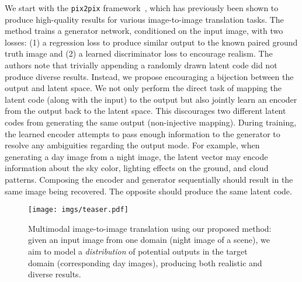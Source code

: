 \documentclass{article}
\newcommand{\pp}{\texttt{pix2pix}\xspace}
\begin{document}
We start with the \pp framework~\citep{isola2016image}, which has previously been shown to produce high-quality results for various image-to-image translation tasks. The method trains a generator network, conditioned on the input image, with two losses: (1) a regression loss to produce similar output to the known paired ground truth image and (2) a learned discriminator loss to encourage realism. The authors note that trivially appending a randomly drawn latent code did not produce diverse results. Instead, we propose encouraging a bijection between the output and latent space. 
We not only perform the direct task of mapping the latent code (along with the input) to the output but also jointly learn an encoder from the output back to the latent space. 
This discourages two different latent codes from generating the same output (non-injective mapping).
During training, the learned encoder attempts to pass enough information to the generator to resolve any ambiguities regarding the output mode.
For example, when generating a day image from a night image, the latent vector may encode information about the sky color, lighting effects on the ground, and cloud patterns.  Composing the encoder and generator sequentially should result in the same image being recovered. The opposite should produce the same latent code.

\begin{figure}
\centering
\texttt{[image: imgs/teaser.pdf]}
\vspace{-4mm}
\caption{\small Multimodal image-to-image translation using our proposed method: given an input image from one domain (night image of a scene), we aim to model a \textit{distribution} of potential outputs in the target domain (corresponding day images), producing both realistic and diverse results.}
\vspace{-4mm}
\label{fig:teaser}
\end{figure}
\end{document}
